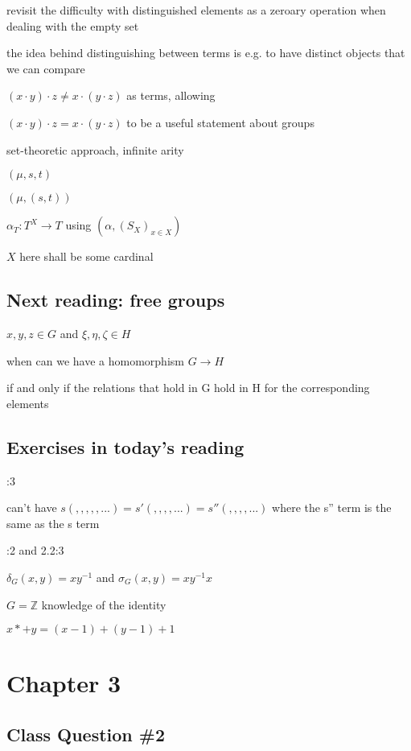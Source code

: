 \documentclass[12pt]{article}
\begin{document}
revisit the difficulty with distinguished elements as a zeroary operation when dealing with the empty set

the idea behind distinguishing between terms is e.g. to have distinct objects that we can compare

$(x \cdot y) \cdot z \neq x \cdot (y \cdot z)$ as terms, allowing

$(x \cdot y) \cdot z = x \cdot (y \cdot z)$ to be a useful statement about groups

\noindent
set-theoretic approach, infinite arity

$(\mu, s, t)$

$(\mu, (s, t))$

$\alpha_T: T^X \to T$ using $(\alpha, (S_X)_{x \in X})$

$X$ here shall be some cardinal

\subsection{Next reading: free groups}

\noindent
$x, y, z \in G$ and $\xi, \eta, \zeta \in H$

when can we have a homomorphism $G \to H$

if and only if the relations that hold in G hold in H for the corresponding elements

\subsection{Exercises in today's reading}

:3

can't have $s( , , , , ,...) = s'( , , , , ...) = s''( , , , , ...)$ where the s'' term is the same as the s term

:2 and 2.2:3

$\delta_G(x, y) = xy^{-1}$ and $\sigma_G(x, y) = xy^{-1}x$

$G = \mathds{Z}$ knowledge of the identity

$x *+ y = (x - 1) + (y - 1) + 1$

\section{Chapter 3}

\subsection{Class Question \#2}
\end{document}
